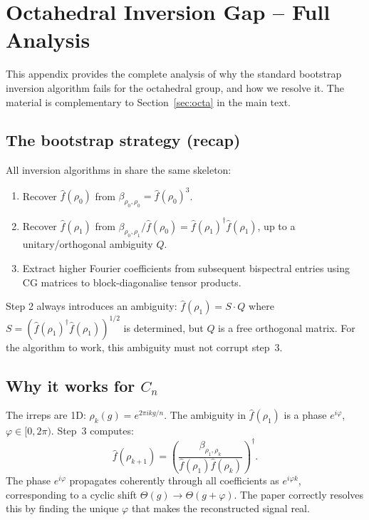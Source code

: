 \documentclass{article}
\begin{document}
\section{Octahedral Inversion Gap -- Full Analysis}
\label{app:octa-convergence}

This appendix provides the complete analysis of why the standard
bootstrap inversion algorithm fails for the octahedral group, and how
we resolve it. The material is complementary to
Section~\ref{sec:octa} in the main text.

\subsection{The bootstrap strategy (recap)}

All inversion algorithms in \citet{mataigne2024selective} share the
same skeleton:
\begin{enumerate}[nosep]
  \item Recover $\hat{f}(\rho_0)$ from
    $\beta_{\rho_0,\rho_0} = \hat{f}(\rho_0)^3$.
  \item Recover $\hat{f}(\rho_1)$ from
    $\beta_{\rho_0,\rho_1}/\hat{f}(\rho_0)
    = \hat{f}(\rho_1)^\dagger \hat{f}(\rho_1)$,
    up to a unitary/orthogonal ambiguity $Q$.
  \item Extract higher Fourier coefficients from subsequent bispectral
    entries using CG matrices to block-diagonalise tensor products.
\end{enumerate}
Step 2 always introduces an ambiguity:
$\hat{f}(\rho_1) = S \cdot Q$ where
$S = (\hat{f}(\rho_1)^\dagger \hat{f}(\rho_1))^{1/2}$ is determined,
but $Q$ is a free orthogonal matrix. For the algorithm to work, this
ambiguity must not corrupt step~3.

\subsection{Why it works for $C_n$}

The irreps are 1D: $\rho_k(g) = e^{2\pi i k g / n}$. The ambiguity in
$\hat{f}(\rho_1)$ is a phase $e^{i\varphi}$,
$\varphi \in [0, 2\pi)$. Step~3 computes:
\[
  \hat{f}(\rho_{k+1}) = \left(\frac{\beta_{\rho_1, \rho_k}}{
    \hat{f}(\rho_1) \hat{f}(\rho_k)}\right)^\dagger.
\]
The phase $e^{i\varphi}$ propagates coherently through all coefficients
as $e^{i\varphi k}$, corresponding to a cyclic shift
$\Theta(g) \to \Theta(g + \varphi)$. The paper correctly resolves this
by finding the unique $\varphi$ that makes the reconstructed signal
real.
\end{document}
